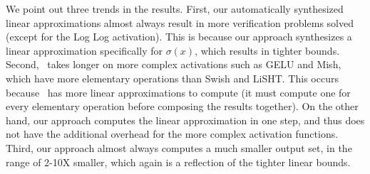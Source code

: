 We point out three trends in the results. First, our automatically synthesized
linear approximations almost always result in more verification problems solved
(except for the Log Log activation). This is because our approach synthesizes a
linear approximation specifically for $ \sigma(x) $, which results in tighter
bounds. Second,~\autolipra{} takes longer
on more complex activations such as GELU and Mish, which have more elementary
operations than Swish and LiSHT. This occurs because~\autolipra{} has more
linear approximations to compute (it must compute one for every elementary
operation before composing the results together). On the other hand, our
approach computes the linear approximation in one step, and thus does not have
the additional overhead for the more complex activation functions. Third, our
approach almost always computes a much smaller output set, in the range of 2-10X
smaller, which again is a reflection of the tighter linear bounds.


